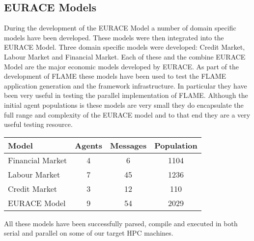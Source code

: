 \subsection{EURACE Models}
During the development of the EURACE Model a number of domain specific models have been developed. These models were then integrated into the EURACE Model. Three domain specific models were developed: Credit Market, Labour Market and Financial Market. Each of these and the combine EURACE Model are the major economic models developed by EURACE. As part of the development of FLAME these models have been used to test the FLAME application generation and the framework infrastructure. In particular they have been very useful in testing the parallel implementation of FLAME. Although the initial agent populations is these models are very small they do encapsulate the full range and complexity of the EURACE model and to that end they are a very useful testing resource.

\begin{table}[ht]
	\centering
		\begin{tabular}{l|ccc}
		Model & Agents & Messages & Population \\\hline
		Financial Market  &    4    &   6       &  1104          \\
		Labour Market   &   7     &    45      &   1236         \\
		Credit Market   &   3     &    12      &   110         \\ 
		EURACE Model    &   9     &    54       &  2029         \\\hline
		\end{tabular}
\end{table}

All these models have been successfully parsed, compile and executed in both serial and parallel on some of our target HPC machines.